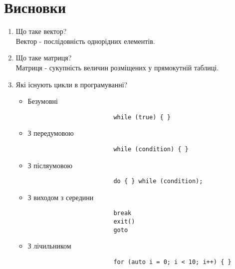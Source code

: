 \section{Висновки}
\label{sec:summary}

\begin{enumerate}
    \item
          Що таке вектор? \\
          Вектор - послідовність однорідних елементів.

    \item
          Що таке матриця? \\
          Матриця - сукупність величин розміщених у прямокутній таблиці.

    \item
          Які існують цикли в програмуванні?
          \begin{itemize}
              \item
                    Безумовні
                    \begin{verbatim}
                        while (true) { }
                    \end{verbatim}

              \item
                    З передумовою
                    \begin{verbatim}
                        while (condition) { }
                    \end{verbatim}

              \item З післяумовою
                    \begin{verbatim}
                        do { } while (condition);
                    \end{verbatim}

              \item
                    З виходом з середини
                    \begin{verbatim}
                        break
                        exit()
                        goto
                    \end{verbatim}

              \item
                    З лічильником
                    \begin{verbatim}
                        for (auto i = 0; i < 10; i++) { }
                    \end{verbatim}


\end{itemize}
\end{enumerate}
